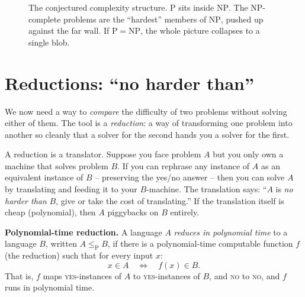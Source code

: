 \begin{figure}[h]
\centering
{}
\caption{The conjectured complexity structure. $\mathrm{P}$ sits inside $\mathrm{NP}$. The
NP-complete problems are the ``hardest'' members of $\mathrm{NP}$, pushed up
against the far wall. If $\mathrm{P}=\mathrm{NP}$, the whole picture collapses to
a single blob.}
\label{ch33:landscape}
\end{figure}

\section{Reductions: ``no harder than''}

We now need a way to \emph{compare} the difficulty of two problems without
solving either of them. The tool is a \emph{reduction}: a way of transforming one
problem into another so cleanly that a solver for the second hands you a solver
for the first.

\begin{intuitionbox}
A reduction is a translator. Suppose you face problem $A$ but you only own a
machine that solves problem $B$. If you can rephrase any instance of $A$ as an
equivalent instance of $B$ -- preserving the yes/no answer -- then you can solve
$A$ by translating and feeding it to your $B$-machine. The translation says: ``$A$
is \emph{no harder than} $B$, give or take the cost of translating.'' If the
translation itself is cheap (polynomial), then $A$ piggybacks on $B$ entirely.
\end{intuitionbox}

\begin{formalbox}
\textbf{Polynomial-time reduction.} A language $A$ \emph{reduces in polynomial
time} to a language $B$, written $A \le_{\mathrm{P}} B$, if there is a
polynomial-time computable function $f$ (the reduction) such that for every input
$x$:
\[
  x \in A \quad\Longleftrightarrow\quad f(x) \in B.
\]
That is, $f$ maps \textsc{yes}-instances of $A$ to \textsc{yes}-instances of $B$,
and \textsc{no} to \textsc{no}, and $f$ runs in polynomial time.
\end{formalbox}

